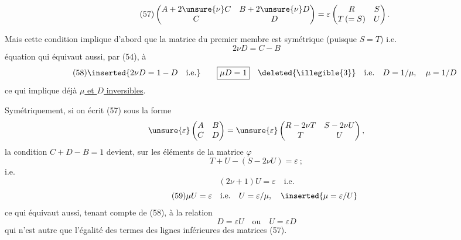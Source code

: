 \[
\tag{57}
\begin{pmatrix}
 A+2\unsure{\nu}C&B+2\unsure{\nu}D\\
 C&D
\end{pmatrix}
=\varepsilon\begin{pmatrix}R&S\\T\,(=S)&U\end{pmatrix}.
\]

Mais cette condition implique d'abord que la matrice du premier membre est symétrique (puisque $S=T$) i.e.
\[
2\nu D=C-B
\]
équation qui équivaut aussi, par (54), à
\[
\tag{58}
\inserted{2\nu D=1-D\quad\text{i.e.}}\qquad
\boxed{\mu D=1}\quad
\deleted{\illegible{3}}\quad
\text{i.e.}\quad D=1/\mu,\quad\mu=1/D
\]
ce qui implique déjà \uline{$\mu$ et $D$ inversibles}.

Symétriquement, si on écrit (57) sous la forme
\[
\unsure{\varepsilon}\begin{pmatrix}A&B\\C&D\end{pmatrix}
=\unsure{\varepsilon}\begin{pmatrix}R-2\nu T&S-2\nu U\\T&U\end{pmatrix},
\]
la condition $C+D-B=1$ devient, sur les éléments de la matrice $\varphi$
\[
T+U-(S-2\nu U)=\varepsilon\ ;
\]
i.e.
\[
(2\nu+1)U=\varepsilon\quad\text{i.e.}
\]
\[
\tag{59}
\mu U=\varepsilon\quad\text{i.e.}\quad U=\varepsilon/\mu,
\quad\inserted{\mu=\varepsilon/U}
\]
ce qui équivaut aussi, tenant compte de (58), à la relation
\[
\tag{60}
D=\varepsilon U\quad\text{ou}\quad U=\varepsilon D
\]
qui n'est autre que l'égalité des termes des lignes inférieures des matrices (57).

